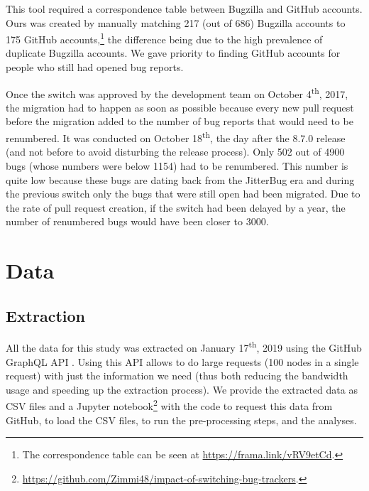 \documentclass[conference]{IEEEtran}
\begin{document}
This tool required a correspondence table between Bugzilla and GitHub accounts. Ours was created by manually matching 217 (out of 686) Bugzilla accounts to 175 GitHub accounts,\footnote{The correspondence table can be seen at \url{https://frama.link/vRV9etCd}.} the difference being due to the high prevalence of duplicate Bugzilla accounts. We gave priority to finding GitHub accounts for people who still had opened bug reports.

Once the switch was approved by the development team on October 4\textsuperscript{th}, 2017, the migration had to happen as soon as possible because every new pull request before the migration added to the number of bug reports that would need to be renumbered. It was conducted %
on October 18\textsuperscript{th},  the day after the 8.7.0 release (and not before to avoid disturbing the release process). Only 502 out of 4900 bugs (whose numbers were below 1154) had to be renumbered. This number is quite low because these bugs are dating back from the JitterBug era and during the previous switch only the bugs that were still open had been migrated.
Due to the rate of pull request creation, if the switch had been delayed by a year, the number of renumbered bugs would have been closer to 3000.

\section{Data}
\label{data}

\subsection{Extraction}

All the data for this study was extracted on January 17\textsuperscript{th}, 2019 using the GitHub GraphQL API \cite{github_graphql_API}. Using this API allows to do large requests (100 nodes in a single request) with just the information we need (thus both reducing the bandwidth usage and speeding up the extraction process). We provide the extracted data as CSV files and a Jupyter notebook\footnote{\url{https://github.com/Zimmi48/impact-of-switching-bug-trackers}.} with the code to request this data from GitHub, to load the CSV files, to run the pre-processing steps, and the analyses.%
\end{document}
